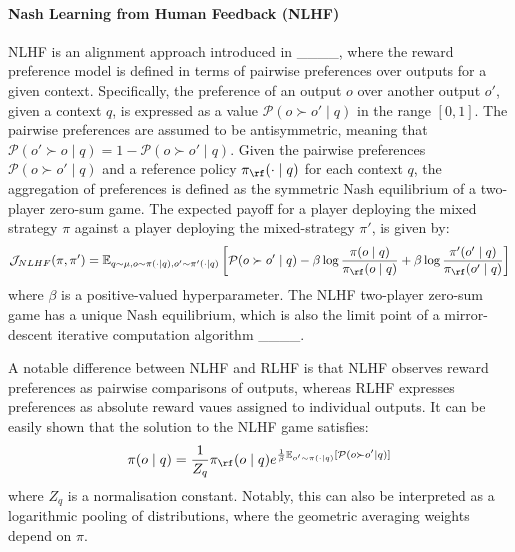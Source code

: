 \paragraph{Nash Learning from Human Feedback (NLHF)} NLHF is an alignment approach introduced in ____, where the reward preference model is defined in terms of pairwise preferences over outputs for a given context. Specifically, the preference of an output $o$ over another output $o'$, given a context $q$, is expressed as a value $\mathcal{P}(o\succ o'\mid q)$ in the range $[0,1]$. The pairwise preferences are assumed to be antisymmetric, meaning that $\mathcal{P}(o'\succ o\mid q)=1-\mathcal{P}(o\succ o'\mid q)$. Given the pairwise preferences $\mathcal{P}(o\succ o'\mid q)$ and a reference policy $\pi_\rf(\cdot\mid q)$ for each context $q$, the aggregation of preferences is defined as the symmetric Nash equilibrium of a two-player zero-sum game. The expected payoff for a player deploying the mixed strategy $\pi$ against a player deploying the mixed-strategy $\pi'$, is given by:
\begin{equation}
\mathcal{J}_{NLHF}(\pi,\pi') = \mathbb{E}_{q\sim \mu, o\sim \pi(\cdot\mid q), o'\sim \pi'(\cdot\mid q)}\left[\mathcal{P}(o\succ o'\mid q) - \beta \log\frac{\pi(o\mid q)}{\pi_\rf(o\mid q)} + \beta \log\frac{\pi'(o'\mid q)}{\pi_\rf(o'\mid q)}\right]
\label{equ:nlhf}
\end{equation}
where $\beta$ is a positive-valued hyperparameter. The NLHF two-player zero-sum game has a unique Nash equilibrium, which is also the limit point of a mirror-descent iterative computation algorithm ____. 

A notable difference between NLHF and RLHF is that NLHF observes reward preferences as pairwise comparisons of outputs, whereas RLHF expresses preferences as absolute reward vaues assigned to individual outputs. It can be easily shown that the solution to the NLHF game satisfies:
$$
\pi(o\mid q) = \frac{1}{Z_q}\pi_\rf(o\mid q) e^{\frac{1}{\beta}\mathbb{E}_{o'\sim \pi(\cdot\mid q)}[\mathcal{P}(o\succ o'\mid q)]}
$$
where $Z_q$ is a normalisation constant. Notably, this can also be interpreted as a logarithmic pooling of distributions, where the geometric averaging weights depend on $\pi$.